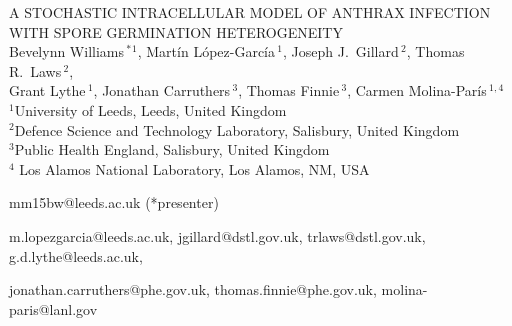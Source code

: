 \documentclass[11pt,a4paper]{article}
\begin{document}
\begingroup
\centering
{\LARGE A STOCHASTIC INTRACELLULAR MODEL OF ANTHRAX INFECTION WITH SPORE GERMINATION HETEROGENEITY \\[1.5em]
\large Bevelynn Williams\,{$^*$}{$^{1}$}, Mart\'in L\'opez-Garc\'ia\,{$^{1}$}, Joseph J.~Gillard\,{$^{2}$}, Thomas R.~Laws\,{$^{2}$}, \\
Grant Lythe\,{$^{1}$}, Jonathan Carruthers\,{$^{3}$}, Thomas Finnie\,{$^{3}$}, Carmen Molina-Par\'is\,{$^{1,4}$}\\[1em]
$^{1}$University of Leeds, Leeds, United Kingdom \\[0.5em]
$^{2}$Defence Science and Technology Laboratory, Salisbury, United Kingdom \\[0.5em]
$^{3}$Public Health England, Salisbury, United Kingdom\\[0.5em]
$^{4}$ Los Alamos National Laboratory, Los Alamos, NM, USA\\[0.5em]
\vspace{0.5em}
\centerline{{mm15bw@leeds.ac.uk (*presenter)}} 


\centerline{
{m.lopezgarcia@leeds.ac.uk}, {jgillard@dstl.gov.uk}, {trlaws@dstl.gov.uk}, {g.d.lythe@leeds.ac.uk},} \centerline{{jonathan.carruthers@phe.gov.uk}, {thomas.finnie@phe.gov.uk}, {molina-paris@lanl.gov}}
}
\endgroup






\vspace{1.0cm}
\end{document}
